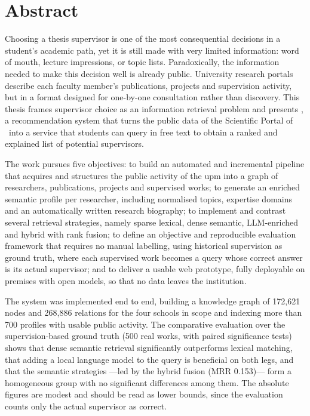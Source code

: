 %

\section*{Abstract}
\label{sec:abstract}

Choosing a thesis supervisor is one of the most consequential decisions in a student's academic path, yet it is still made with very limited information: word of mouth, lecture impressions, or topic lists.
Paradoxically, the information needed to make this decision well is already public.
University research portals describe each faculty member's publications, projects and supervision activity, but in a format designed for one-by-one consultation rather than discovery.
This thesis frames supervisor choice as an information retrieval problem and presents \proyecto, a recommendation system that turns the public data of the Scientific Portal of \University~into a service that students can query in free text to obtain a ranked and explained list of potential supervisors.

The work pursues five objectives: to build an automated and incremental pipeline that acquires and structures the public activity of the \gls{upm} into a graph of researchers, publications, projects and supervised works; to generate an enriched semantic profile per researcher, including normalised topics, expertise domains and an automatically written research biography; to implement and contrast several retrieval strategies, namely sparse lexical, dense semantic, LLM-enriched and hybrid with rank fusion; to define an objective and reproducible evaluation framework that requires no manual labelling, using historical supervision as ground truth, where each supervised work becomes a query whose correct answer is its actual supervisor; and to deliver a usable web prototype, fully deployable on premises with open models, so that no data leaves the institution.

The system was implemented end to end, building a knowledge graph of 172{,}621 nodes and 268{,}886 relations for the four schools in scope and indexing more than 700 profiles with usable public activity.
The comparative evaluation over the supervision-based ground truth (500 real works, with paired significance tests) shows that dense semantic retrieval significantly outperforms lexical matching, that adding a local language model to the query is beneficial on both legs, and that the semantic strategies ---led by the hybrid fusion (MRR 0.153)--- form a homogeneous group with no significant differences among them.
The absolute figures are modest and should be read as lower bounds, since the evaluation counts only the actual supervisor as correct.

